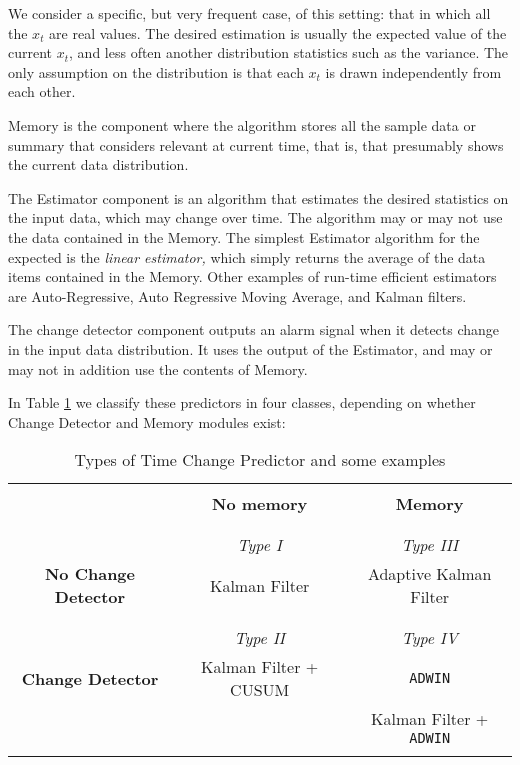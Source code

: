 We consider a specific, but very frequent case, of this setting: that in which 
all the $x_t$ are real values. The desired estimation is usually the expected value of the 
current $x_t$, and less often another distribution statistics such as the variance. 
The only assumption on the distribution is that each $x_t$ is drawn independently from each other.

Memory is the component where the algorithm stores all the sample data or summary that considers
relevant at current time, that is, that presumably shows the current data distribution. 

The Estimator component is an algorithm that estimates the desired statistics on the input data, which
may change over time. The algorithm may or may not use the data contained in the Memory. 
The simplest Estimator algorithm for the expected is the {\em linear estimator,}
which simply returns the average of the data items contained in the Memory. 
Other examples of run-time efficient estimators are 
Auto-Regressive, Auto Regressive Moving Average, and Kalman filters. 

The change detector component outputs an alarm signal when it detects change in the input data distribution. 
It uses the output of the Estimator, and may or may not in addition use the contents of Memory. 

In Table \ref{tab:Types} we classify these predictors in four classes, depending on whether 
Change Detector and Memory modules exist:

\begin{table}[htpb]
\centering
\begin{tabular}{|c|c|c|}
\hline%
& &\\
& {\bf No memory} & {\bf Memory} \\
& &\\
\hline%
& &\\
& {\em Type I}&{\em Type III}\\
{\bf No Change Detector}& Kalman Filter & Adaptive Kalman Filter \\
& &\\
\hline%
& &\\
& {\em Type II}&{\em Type IV}\\
{\bf Change Detector}& Kalman Filter + CUSUM & {\tt ADWIN} \\ 
& & Kalman Filter + {\tt ADWIN} \\ 
& &\\
\hline%
\end{tabular}
\caption{Types of Time Change Predictor and some examples}
\label{tab:Types}
\end{table}

